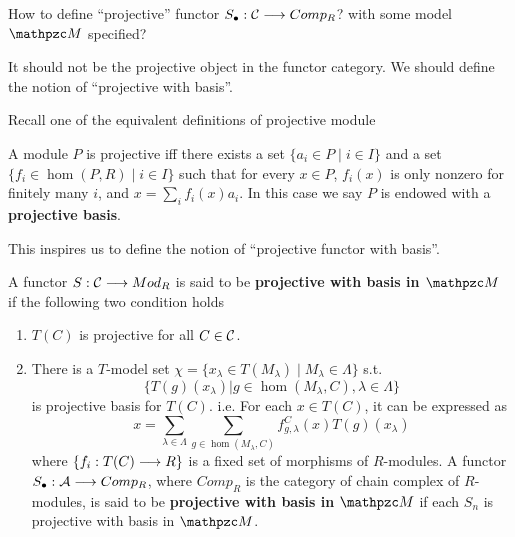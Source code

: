 \documentclass[11pt]{book} %
\begin{document}
How to define ``projective'' functor $S_\bullet: {\cal C}\longrightarrow Comp_R$? with some model $\pzm$ specified?

It should not be the projective object in the functor category. We should define the notion of ``projective with basis''.

Recall one of the equivalent definitions of projective module

A module $P$ is projective iff there exists a set $\{a_i\in P\mid i\in I\}$ and a set $\{f_i\in \hom(P,R)\mid i\in I\}$ such that for every $x\in P$, $f_i(x)$ is only nonzero for finitely many $i$, and $x=\sum_i f_i(x)a_i$. In this case we say $P$ is endowed with a \textbf{projective basis}.

This inspires us to define the notion of ``projective functor with basis''.

\begin{definition}
A functor $S: {\cal C}\longrightarrow Mod_{R}$ is said to be \textbf{projective with basis in $\pzm$} if the following two condition holds
\begin{enumerate}
\item $T(C)$ is projective for all $C\in{\cal C}$.
\item There is a $T$-model set $\chi=\{x_\lambda\in T(M_\lambda)\mid M_\lambda\in \Lambda\}$ s.t.
$$
\{T(g)(x_\lambda)|g\in \hom(M_\lambda,C), \lambda\in \Lambda\}
$$
is projective basis for $T(C)$. i.e.
For each $x\in T(C)$, it can be expressed as
$$
x=\sum_{\lambda\in \Lambda}\sum_{g\in \hom(M_\lambda,C)} f_{g,\lambda}^C(x)T(g)(x_\lambda)
$$
where $\{f_i: T(C)\longrightarrow R\}$ is a fixed set of morphisms of $R$-modules.
A functor $S_\bullet:{\cal A}\longrightarrow Comp_R$, where $Comp_R$ is the category of chain complex of $R$-modules, is said to be \textbf{projective with basis in $\pzm$} if each $S_n$ is projective with basis in $\pzm$. 
\end{enumerate}
\end{definition}
\end{document}

